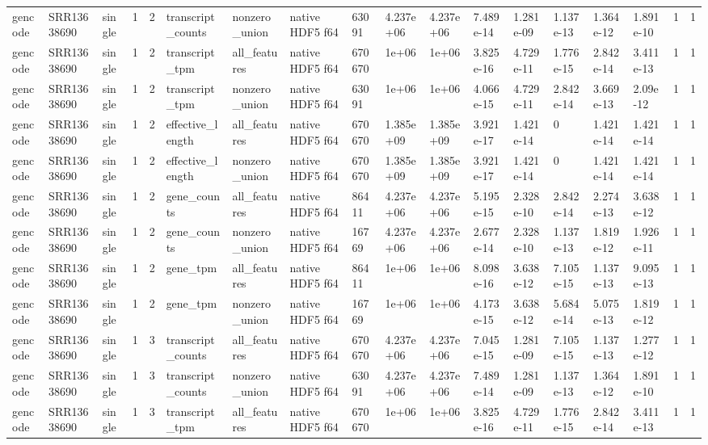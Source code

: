 \begin{tabular}{llllllllllllllllll}
gencode & SRR13638690 & single & 1 & 2 & transcript\_counts & nonzero\_union & native HDF5 f64 & 63091 & 4.237e+06 & 4.237e+06 & 7.489e-14 & 1.281e-09 & 1.137e-13 & 1.364e-12 & 1.891e-10 & 1 & 1 \\
gencode & SRR13638690 & single & 1 & 2 & transcript\_tpm & all\_features & native HDF5 f64 & 670670 & 1e+06 & 1e+06 & 3.825e-16 & 4.729e-11 & 1.776e-15 & 2.842e-14 & 3.411e-13 & 1 & 1 \\
gencode & SRR13638690 & single & 1 & 2 & transcript\_tpm & nonzero\_union & native HDF5 f64 & 63091 & 1e+06 & 1e+06 & 4.066e-15 & 4.729e-11 & 2.842e-14 & 3.669e-13 & 2.09e-12 & 1 & 1 \\
gencode & SRR13638690 & single & 1 & 2 & effective\_length & all\_features & native HDF5 f64 & 670670 & 1.385e+09 & 1.385e+09 & 3.921e-17 & 1.421e-14 & 0 & 1.421e-14 & 1.421e-14 & 1 & 1 \\
gencode & SRR13638690 & single & 1 & 2 & effective\_length & nonzero\_union & native HDF5 f64 & 670670 & 1.385e+09 & 1.385e+09 & 3.921e-17 & 1.421e-14 & 0 & 1.421e-14 & 1.421e-14 & 1 & 1 \\
gencode & SRR13638690 & single & 1 & 2 & gene\_counts & all\_features & native HDF5 f64 & 86411 & 4.237e+06 & 4.237e+06 & 5.195e-15 & 2.328e-10 & 2.842e-14 & 2.274e-13 & 3.638e-12 & 1 & 1 \\
gencode & SRR13638690 & single & 1 & 2 & gene\_counts & nonzero\_union & native HDF5 f64 & 16769 & 4.237e+06 & 4.237e+06 & 2.677e-14 & 2.328e-10 & 1.137e-13 & 1.819e-12 & 1.926e-11 & 1 & 1 \\
gencode & SRR13638690 & single & 1 & 2 & gene\_tpm & all\_features & native HDF5 f64 & 86411 & 1e+06 & 1e+06 & 8.098e-16 & 3.638e-12 & 7.105e-15 & 1.137e-13 & 9.095e-13 & 1 & 1 \\
gencode & SRR13638690 & single & 1 & 2 & gene\_tpm & nonzero\_union & native HDF5 f64 & 16769 & 1e+06 & 1e+06 & 4.173e-15 & 3.638e-12 & 5.684e-14 & 5.075e-13 & 1.819e-12 & 1 & 1 \\
gencode & SRR13638690 & single & 1 & 3 & transcript\_counts & all\_features & native HDF5 f64 & 670670 & 4.237e+06 & 4.237e+06 & 7.045e-15 & 1.281e-09 & 7.105e-15 & 1.137e-13 & 1.277e-12 & 1 & 1 \\
gencode & SRR13638690 & single & 1 & 3 & transcript\_counts & nonzero\_union & native HDF5 f64 & 63091 & 4.237e+06 & 4.237e+06 & 7.489e-14 & 1.281e-09 & 1.137e-13 & 1.364e-12 & 1.891e-10 & 1 & 1 \\
gencode & SRR13638690 & single & 1 & 3 & transcript\_tpm & all\_features & native HDF5 f64 & 670670 & 1e+06 & 1e+06 & 3.825e-16 & 4.729e-11 & 1.776e-15 & 2.842e-14 & 3.411e-13 & 1 & 1 \\

\end{tabular}
